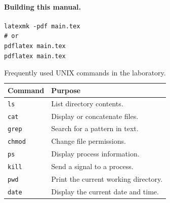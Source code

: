 \paragraph{Building this manual.}
\begin{lstlisting}[style=terminal]
latexmk -pdf main.tex
# or
pdflatex main.tex
pdflatex main.tex
\end{lstlisting}

\begin{table}[H]
\centering
\renewcommand{\arraystretch}{1.2}
\small
\begin{tabularx}{\textwidth}{|l|>{\raggedright\arraybackslash}X|}
\hline
\textbf{Command} & \textbf{Purpose} \\ \hline
\texttt{ls} & List directory contents. \\ \hline
\texttt{cat} & Display or concatenate files. \\ \hline
\texttt{grep} & Search for a pattern in text. \\ \hline
\texttt{chmod} & Change file permissions. \\ \hline
\texttt{ps} & Display process information. \\ \hline
\texttt{kill} & Send a signal to a process. \\ \hline
\texttt{pwd} & Print the current working directory. \\ \hline
\texttt{date} & Display the current date and time. \\ \hline
\end{tabularx}
\caption{Frequently used UNIX commands in the laboratory.}
\end{table}
